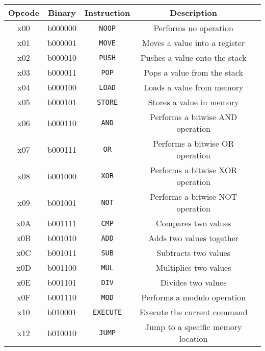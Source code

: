 \documentclass[12pt,a4paper]{article}
\begin{document}
\begin{center}
\begin{tabular}{ c c c c c }
    \textbf{Opcode} & \textbf{Binary} & \textbf{Instruction} & \textbf{Description} \\
    \hline
    x00 & b000000 & \texttt{NOOP} & Performs no operation \\

    \hline

    x01 & b000001 & \texttt{MOVE} & Moves a value into a register \\

    \hline

    x02 & b000010 & \texttt{PUSH} & Pushes a value onto the stack \\
    x03 & b000011 & \texttt{POP} & Pops a value from the stack \\
    x04 & b000100 & \texttt{LOAD} & Loads a value from memory \\
    x05 & b000101 & \texttt{STORE} & Stores a value in memory \\

    \hline

    x06 & b000110 & \texttt{AND} & Performs a bitwise AND operation \\
    x07 & b000111 & \texttt{OR} & Performs a bitwise OR operation \\
    x08 & b001000 & \texttt{XOR} & Performs a bitwise XOR operation \\
    x09 & b001001 & \texttt{NOT} & Performs a bitwise NOT operation \\
    x0A & b001111 & \texttt{CMP} & Compares two values \\

    \hline

    x0B & b001010 & \texttt{ADD} & Adds two values together \\
    x0C & b001011 & \texttt{SUB} & Subtracts two values \\
    x0D & b001100 & \texttt{MUL} & Multiplies two values \\
    x0E & b001101 & \texttt{DIV} & Divides two values \\
    x0F & b001110 & \texttt{MOD} & Performs a modulo operation \\

    \hline

    x10 & b010001 & \texttt{EXECUTE} & Execute the current command \\
    x12 & b010010 & \texttt{JUMP} & Jump to a specific memory location \\
\end{tabular}
\end{center}
\end{document}
